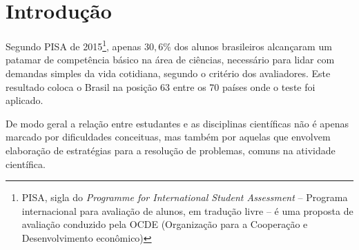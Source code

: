 \chapter*[Introdução]{Introdução}

Segundo PISA de 2015\footnote{PISA, sigla do \textit{Programme for International Student Assessment} -- Programa internacional para avaliação de alunos, em tradução livre -- é uma proposta de avaliação conduzido pela OCDE (Organização para a Cooperação e Desenvolvimento econômico)}, apenas $30,6\%$ dos alunos brasileiros alcançaram um patamar de competência básico na área de ciências, necessário para lidar com demandas simples da vida cotidiana, segundo o critério dos avaliadores. Este resultado coloca o Brasil na posição 63 entre os 70 países onde o teste foi aplicado.

De modo geral a relação entre estudantes e as disciplinas científicas não é apenas marcado por dificuldades conceituas, mas também por aquelas que envolvem elaboração de estratégias para a resolução de problemas, comuns na atividade científica.


